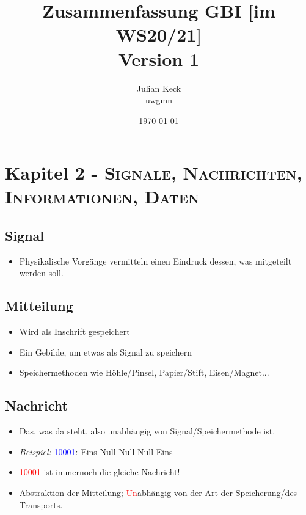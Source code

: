 \documentclass{article}
\newcommand{\subtitlerelsize}{1} %
\newcommand{\subtitlelinesep}{0.1em} %
\newcommand{\kapitel}[2]{Kapitel #1 - \textsc{#2}}
\newcommand{\blue}[1]{\textcolor{blue}{#1}}
\newcommand{\red}[1]{\textcolor{red}{#1}}
\newcommand{\example}[1]{\textit{Beispiel: }#1}
\begin{document}
\title{Zusammenfassung GBI [im WS20/21]\\[\subtitlelinesep]%
    \smaller[\subtitlerelsize]{}Version 1}
\author{Julian Keck\\uwgmn}
\date{\today}

\maketitle

\tableofcontents

\newpage

\section{\kapitel{2}{Signale, Nachrichten, Informationen, Daten}}
\subsection{Signal}
\begin{itemize}
    \item Physikalische Vorgänge vermitteln einen \dq Eindruck\dq{} dessen, was mitgeteilt werden soll.
\end{itemize}

\subsection{Mitteilung}
\begin{itemize}
    \item Wird als Inschrift gespeichert
    \item Ein Gebilde, um etwas als Signal zu speichern
    \item Speichermethoden wie Höhle/Pinsel, Papier/Stift, Eisen/Magnet...
\end{itemize}

\subsection{Nachricht}
\begin{itemize}
    \item Das, was da steht, also unabhängig von Signal/Speichermethode ist.
    \item \example{\blue{10001}: Eins Null Null Null Eins}
    \item \red{10001} ist immernoch die gleiche Nachricht!
    \item Abstraktion der Mitteilung; \red{Un}abhängig von der Art der Speicherung/des Transports.
\end{itemize}
\end{document}
